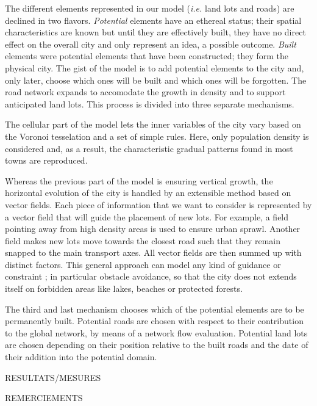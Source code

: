 \documentclass[12pt]{article}
\begin{document}
The different elements represented in our model (\textit{i.e.} land
lots and roads) are declined in two flavors. \textit{Potential}
elements have an ethereal status; their spatial characteristics are
known but until they are effectively built, they have no direct effect
on the overall city and only represent an idea, a possible
outcome. \textit{Built} elements were potential elements that have
been constructed; they form the physical city. The gist of the model
is to add potential elements to the city and, only later, choose which
ones will be built and which ones will be forgotten. The road network
expands to accomodate the growth in density and to support anticipated
land lots. This process is divided into three separate mechanisms.

The cellular part of the model lets the inner variables of the city
vary based on the Voronoi tesselation and a set of simple rules. Here,
only population density is considered and, as a result, the
characteristic gradual patterns found in most towns are reproduced.

Whereas the previous part of the model is ensuring vertical growth,
the horizontal evolution of the city is handled by an extensible
method based on vector fields. Each piece of information that we want
to consider is represented by a vector field that will guide the
placement of new lots. For example, a field pointing away from high
density areas is used to ensure urban sprawl. Another field makes new
lots move towards the closest road such that they remain snapped to
the main transport axes. All vector fields are then summed up with
distinct factors. This general approach can model any kind of guidance
or constraint ; in particular obstacle avoidance, so that the city
does not extends itself on forbidden areas like lakes, beaches or
protected forests.

The third and last mechanism chooses which of the potential elements
are to be permanently built. Potential roads are chosen with respect
to their contribution to the global network, by means of a network
flow evaluation. Potential land lots are chosen depending on their
position relative to the built roads and the date of their addition
into the potential domain.

RESULTATS/MESURES

\newpage

\tableofcontents

\newpage

REMERCIEMENTS

\newpage
\end{document}
